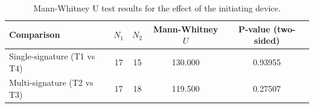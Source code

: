 \begin{table}[tbp]
\centering
\begin{tabular}{lcccc}
\toprule
Comparison & $N_1$ & $N_2$ & Mann-Whitney $U$ & P-value (two-sided) \\ \midrule
Single-signature (T1 vs T4) & 17 & 15 & 130.000 & 0.93955 \\
Multi-signature (T2 vs T3) & 17 & 18 & 119.500 & 0.27507 \\
\bottomrule
\end{tabular}
\caption{Mann-Whitney U test results for the effect of the initiating device.}
\label{tab:mannwhitney_device_results}
\end{table}
